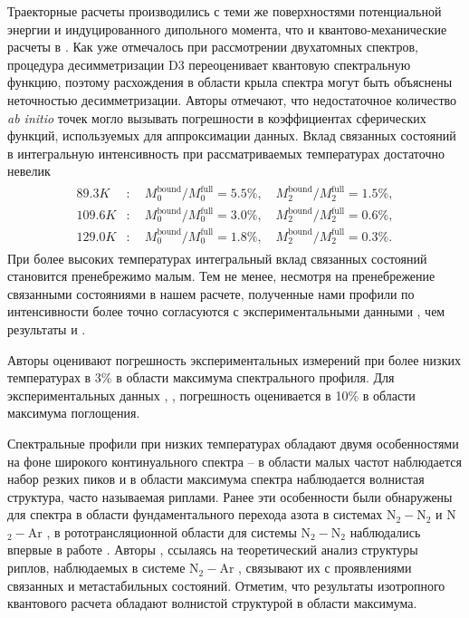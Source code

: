 Траекторные расчеты производились с теми же поверхностями потенциальной энергии и индуцированного дипольного момента, что и квантово-механические расчеты в \cite{karman2015}. Как уже отмечалось при рассмотрении двухатомных спектров, процедура десимметризации D3 переоценивает квантовую спектральную функцию, поэтому расхождения в области крыла спектра могут быть объяснены неточностью десимметризации. Авторы \cite{karman2015} отмечают, что недостаточное количество \textit{ab initio} точек могло вызывать погрешности в коэффициентах сферических функций, используемых для аппроксимации данных. Вклад связанных состояний в интегральную интенсивность при рассматриваемых температурах достаточно невелик
\begin{gather}
    \begin{aligned}
        89.3K  &: \quad M_0^\text{bound} / M_0^\text{full} = 5.5\%, \quad M_2^\text{bound} / M_2^\text{full} = 1.5\%, \\
        109.6K &: \quad M_0^\text{bound} / M_0^\text{full} = 3.0\%, \quad M_2^\text{bound} / M_2^\text{full} = 0.6\%, \\
        129.0K &: \quad M_0^\text{bound} / M_0^\text{full} = 1.8\%, \quad M_2^\text{bound} / M_2^\text{full} = 0.3\%. 
    \end{aligned}
\end{gather}
При более высоких температурах интегральный вклад связанных состояний становится пренебрежимо малым. Тем не менее, несмотря на пренебрежение связанными состояниями в нашем расчете, полученные нами профили по интенсивности более точно согласуются с экспериментальными данными \cite{karman2019}, чем результаты \cite{karman2015} и \cite{borysow1986}. \par
Авторы \cite{karman2019} оценивают погрешность экспериментальных измерений при более низких температурах в 3\% в области максимума спектрального профиля. Для экспериментальных данных \cite{stone1984}, \cite{buontempo1975}, \cite{dagg1985} погрешность оценивается в 10\% в области максимума поглощения. \par
Спектральные профили при низких температурах обладают двумя особенностями на фоне широкого континуального спектра -- в области малых частот наблюдается набор резких пиков и в области максимума спектра наблюдается волнистая структура, часто называемая риплами. Ранее эти особенности были обнаружены для спектра в области фундаментального перехода азота в системах N$_2-$N$_2$ и N$_2-$Ar \cite{mckellar1988}, в рототрансляционной области для системы N$_2-$N$_2$ наблюдались впервые в работе \cite{wishnow1996}. Авторы \cite{mckellar1988}, ссылаясь на теоретический анализ структуры риплов, наблюдаемых в системе N$_2-$Ar \cite{brocks1988}, связывают их с проявлениями связанных и метастабильных состояний. Отметим, что результаты изотропного квантового расчета \cite{borysow1986} обладают волнистой структурой в области максимума. \par 
